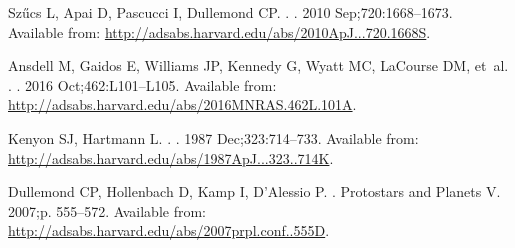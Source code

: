 \documentclass[]{rsos}
\begin{document}
\begin{thebibliography}{10}
{Sz{\H u}cs} L, {Apai} D, {Pascucci} I, {Dullemond} CP.
.
\newblock \apj. 2010 Sep;720:1668--1673.
\newblock Available from:
  \url{http://adsabs.harvard.edu/abs/2010ApJ...720.1668S}.

{Ansdell} M, {Gaidos} E, {Williams} JP, {Kennedy} G, {Wyatt} MC, {LaCourse} DM,
  et~al.
.
\newblock \mnras. 2016 Oct;462:L101--L105.
\newblock Available from:
  \url{http://adsabs.harvard.edu/abs/2016MNRAS.462L.101A}.

{Kenyon} SJ, {Hartmann} L.
.
\newblock \apj. 1987 Dec;323:714--733.
\newblock Available from:
  \url{http://adsabs.harvard.edu/abs/1987ApJ...323..714K}.

{Dullemond} CP, {Hollenbach} D, {Kamp} I, {D'Alessio} P.
.
\newblock Protostars and Planets V. 2007;p. 555--572.
\newblock Available from:
  \url{http://adsabs.harvard.edu/abs/2007prpl.conf..555D}.

\end{thebibliography}
\end{document}
